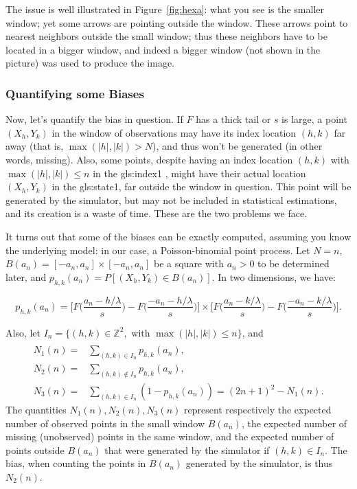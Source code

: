 \documentclass[10pt]{article}
\begin{document}
The issue is well illustrated in Figure~\ref{fig:hexa}: what you see is the smaller window; yet some arrows are pointing outside the window. These arrows point to nearest neighbors outside the small window; thus these neighbors have to be located in a bigger window, and indeed a bigger window (not shown in the picture) was used to produce the image.

\subsubsection{Quantifying some Biases}

Now, let's quantify the bias in question. If $F$ has a thick tail or $s$ is large, a point $(X_h,Y_k)$ in the window of observations may have its index location $(h,k)$ far away (that is, $\max(|h|,|k|)>N$), and thus won't be generated (in other words, missing). Also, some points, despite having an index location
$(h,k)$ with  $\max(|h|,|k|)\leq n$ in the \gls{gls:index1} , might have their actual location $(X_h,Y_k)$ in the \gls{gls:state1}, far outside the window in question. This point will be generated by the simulator, but may not be included in statistical estimations, and its creation is a waste of time. These are the two problems we face.

It turns out that some of the biases can be exactly computed, assuming you know the underlying model: in our case, a Poisson-binomial point process. Let $N=n$,
$B(a_n)=[-a_n,a_n]\times [-a_n,a_n]$ be a square with $a_n>0$ to be determined later, and $p_{h,k}(a_n)=P[(X_h,Y_k)\in B(a_n)]$. In two dimensions, we have:

$$p_{h,k}(a_n)=\Big[F\Big(\frac{a_n-h/\lambda}{s}\Big)-F\Big(\frac{-a_n-h/\lambda}{s}\Big) \Big]\times
\Big[F\Big(\frac{a_n-k/\lambda}{s}\Big)-F\Big(\frac{-a_n-k/\lambda}{s}\Big)\Big].$$

\noindent Also, let $I_n=  \{(h,k)\in \mathbb{Z}^2, \mbox{ with } \max(|h|,|k|)\leq n \}$, and
\begin{align}
 \nonumber \\
N_1(n)= &\sum_{(h,k)\in I_n} p_{h,k}(a_n),\nonumber \\
N_2(n)= &\sum_{(h,k)\notin I_n} p_{h,k}(a_n),\nonumber \\
N_3(n)=&\sum_{(h,k) \in I_n} (1-p_{h,k}(a_n)) = (2n+1)^2-N_1(n). \nonumber
\end{align}
The quantities $N_1(n),N_2(n),N_3(n)$ represent respectively the expected number of observed points in the small window $B(a_n)$, the expected number of missing (unobserved) points in the same window, and the expected number of points outside $B(a_n)$ that were generated by the simulator if $(h,k)\in I_n$. The bias, when counting the points in $B(a_n)$ generated by the simulator, is thus  $N_2(n)$.
\end{document}
